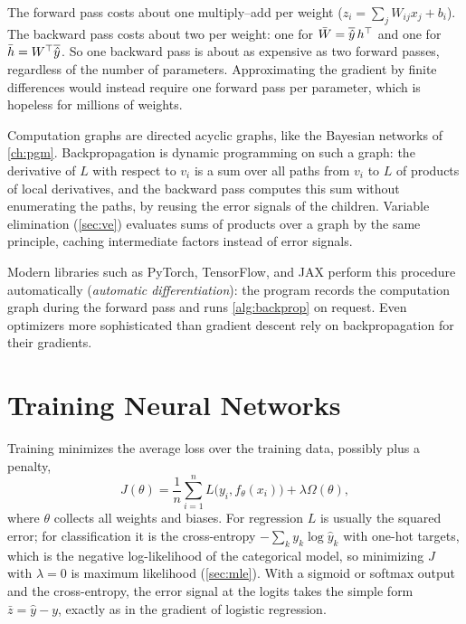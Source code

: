 \begin{remark}[Cost]
The forward pass costs about one multiply--add per weight ($z_i=\sum_jW_{ij}x_j+b_i$). The backward pass costs about two per weight: one for $\bar W=\overline{\hat y}\,h^{\top}$ and one for $\bar h=W^{\top}\overline{\hat y}$. So one backward pass is about as expensive as two forward passes, regardless of the number of parameters. Approximating the gradient by finite differences would instead require one forward pass per parameter, which is hopeless for millions of weights.
\end{remark}

\begin{remark}
Computation graphs are directed acyclic graphs, like the Bayesian networks of \cref{ch:pgm}. Backpropagation is dynamic programming on such a graph: the derivative of $L$ with respect to $v_i$ is a sum over all paths from $v_i$ to $L$ of products of local derivatives, and the backward pass computes this sum without enumerating the paths, by reusing the error signals of the children. Variable elimination (\cref{sec:ve}) evaluates sums of products over a graph by the same principle, caching intermediate factors instead of error signals.
\end{remark}

Modern libraries such as PyTorch, TensorFlow, and JAX perform this procedure automatically (\emph{automatic differentiation}): the program records the computation graph during the forward pass and runs \cref{alg:backprop} on request. Even optimizers more sophisticated than gradient descent rely on backpropagation for their gradients.

\section{Training Neural Networks}\label{sec:nn-training}

Training minimizes the average loss over the training data, possibly plus a penalty,
\[
J(\theta)=\frac1n\sum_{i=1}^nL\big(y_i,f_\theta(x_i)\big)+\lambda \Omega(\theta),
\]
where $\theta$ collects all weights and biases. For regression $L$ is usually the squared error; for classification it is the cross-entropy $-\sum_ky_k\log\hat y_k$ with one-hot targets, which is the negative log-likelihood of the categorical model, so minimizing $J$ with $\lambda=0$ is maximum likelihood (\cref{sec:mle}). With a sigmoid or softmax output and the cross-entropy, the error signal at the logits takes the simple form $\bar z=\hat y-y$, exactly as in the gradient of logistic regression.

